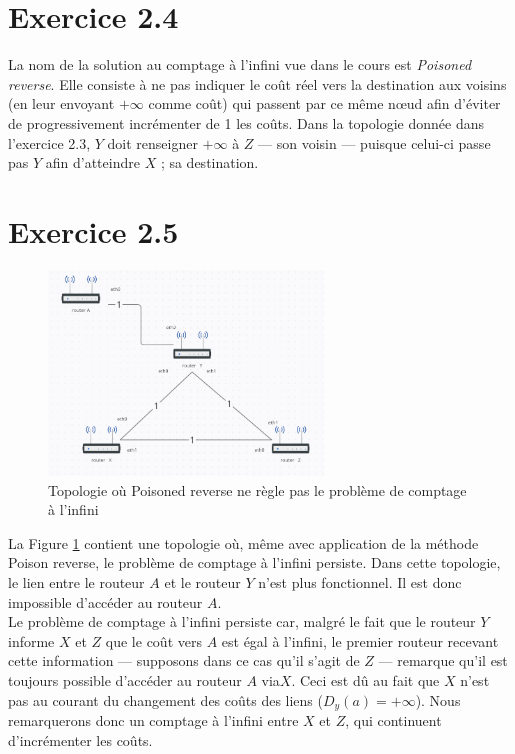 \documentclass[11pt]{article}
\begin{document}
\section{Exercice 2.4}
La nom de la solution au comptage à l'infini vue dans le cours est \textit{Poisoned reverse}. Elle consiste à ne pas indiquer le coût réel vers la destination aux voisins (en leur envoyant $+\infty$ comme coût) qui passent par ce même nœud afin d'éviter de progressivement incrémenter de 1 les coûts. Dans la topologie donnée dans l'exercice 2.3, $Y$ doit renseigner $+\infty$ à $Z$ --- son voisin --- puisque celui-ci passe pas $Y$ afin d'atteindre $X$ ; sa destination.\\



\section{Exercice 2.5}
\begin{figure} [h!]
\centering
  \includegraphics[width=0.65\textwidth]{../documents/problem-figure.png}
  \caption{Topologie où Poisoned reverse ne règle pas le problème de comptage à l'infini}
   \label{fig:prob-fig}
\end{figure}

La Figure \ref{fig:prob-fig} contient une topologie où, même avec application de la méthode Poison reverse, le problème de comptage à l'infini persiste. Dans cette topologie, le lien entre le routeur $A$ et le routeur $Y$ n'est plus fonctionnel. Il est donc impossible d'accéder au routeur $A$.\\

Le problème de comptage à l'infini persiste car, malgré le fait que le routeur $Y$ informe $X$ et $Z$ que le coût vers $A$ est égal à l'infini, le premier routeur recevant cette information --- supposons dans ce cas qu'il s'agit de $Z$ --- remarque qu'il est toujours possible d'accéder au routeur $A$ via$ X$. Ceci est dû au fait que $X$ n'est pas au courant du changement des coûts des liens ($D_{y}(a)=+\infty$). Nous remarquerons donc un comptage à l'infini entre $X$ et $Z$, qui continuent d'incrémenter les coûts.\\
\end{document}
